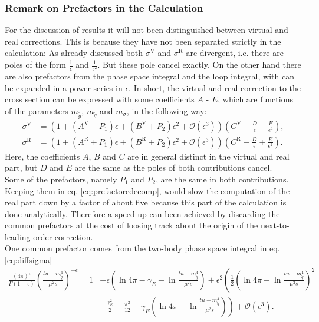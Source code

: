 \subsubsection{Remark on Prefactors in the Calculation}
For the discussion of results it will not been distinguished between virtual and real corrections. This is because they have not been separated strictly in the calculation: As already discussed both $\sigma^{\mathrm{V}}$ and $\sigma^{\mathrm{R}}$ are divergent, i.e. there are poles of the form $\frac{1}{\epsilon}$ and $\frac{1}{\epsilon^2}$. But these pole cancel exactly. On the other hand there are also prefactors from the phase space integral and the loop integral, with can be expanded in a power series in $\epsilon$. In short, the virtual and real correction to the cross section can be expressed with some coefficients $A$ - $E$, which are functions of the parameters $m_{\tilde{g}}$, $m_{\tilde{q}}$ and $m_{\sigma}$, in the following way:
\begin{align}
\sigma^{\mathrm{V}} &= \left( 1 + (A^{\mathrm{V}} + P_1)\epsilon + (B^{\mathrm{V}} + P_2)\epsilon^2 + \mathcal{O}(\epsilon^3) \right)\left( C^{\mathrm{V}} - \frac{D}{\epsilon} - \frac{E}{\epsilon^2} \right),\\
\sigma^{\mathrm{R}} &= \left( 1 + (A^{\mathrm{R}} + P_1)\epsilon + (B^{\mathrm{R}} + P_2)\epsilon^2 + \mathcal{O}(\epsilon^3) \right)\left( C^{\mathrm{R}} + \frac{D}{\epsilon} + \frac{E}{\epsilon^2} \right).\label{eq:prefactoredecomp}
\end{align}
Here, the coefficients $A$, $B$ and $C$ are in general distinct in the virtual and real part, but $D$ and $E$ are the same as the poles of both contributions cancel.\\
Some of the prefactors, namely $P_1$ and $P_2$, are the same in both contributions. Keeping them in eq. \eqref{eq:prefactoredecomp}, would slow the computation of the real part down by a factor of about five because this part of the calculation is done analytically. Therefore a speed-up can been achieved by discarding the common prefactors at the cost of loosing track about the origin of the next-to-leading order correction.\\
One common prefactor comes from the two-body phase space integral in eq. \eqref{eq:diffsigma}
\begin{align}
\frac{(4\pi)^\epsilon}{\Gamma(1-\epsilon)}\left( \frac{tu - m_{\tilde{q}}^4}{\mu^2 s} \right)^{-\epsilon} = 1 &+ \epsilon\left( \ln 4\pi -\gamma_E - \ln \frac{tu - m_{\tilde{q}}^4}{\mu^2 s} \right)  
+ \epsilon^2\left( \frac{1}{2}\left( \ln 4\pi - \ln \frac{tu - m_{\tilde{q}}^4}{\mu^2 s} \right)^2 \right.\nonumber\\
&+ \left.\frac{\gamma_E^2}{2} - \frac{\pi^2}{12} - \gamma_E\left( \ln 4\pi - \ln \frac{tu - m_{\tilde{q}}^4}{\mu^2 s} \right) \right) + \mathcal{O}(\epsilon^3).\label{eq:PhasePrefactor}
\end{align}
